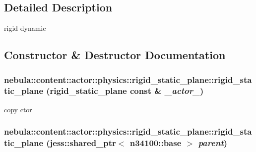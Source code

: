 \subsection{Detailed Description}
rigid dynamic 

\subsection{Constructor \& Destructor Documentation}
\hypertarget{classnebula_1_1content_1_1actor_1_1physics_1_1rigid__static__plane_a1d27dcdd2e2648e8296620dbdd05388e}{
\subsubsection[{rigid\_\-static\_\-plane}]{\setlength{\rightskip}{0pt plus 5cm}nebula::content::actor::physics::rigid\_\-static\_\-plane::rigid\_\-static\_\-plane ({\bf rigid\_\-static\_\-plane} const \& {\em \_\-actor\_\-})}}
\label{classnebula_1_1content_1_1actor_1_1physics_1_1rigid__static__plane_a1d27dcdd2e2648e8296620dbdd05388e}


copy ctor \hypertarget{classnebula_1_1content_1_1actor_1_1physics_1_1rigid__static__plane_ad45cff77846da49496d5025f483fd1ce}{
\subsubsection[{rigid\_\-static\_\-plane}]{\setlength{\rightskip}{0pt plus 5cm}nebula::content::actor::physics::rigid\_\-static\_\-plane::rigid\_\-static\_\-plane (jess::shared\_\-ptr$<$ {\bf n34100::base} $>$ {\em parent})}}
\label{classnebula_1_1content_1_1actor_1_1physics_1_1rigid__static__plane_ad45cff77846da49496d5025f483fd1ce}


